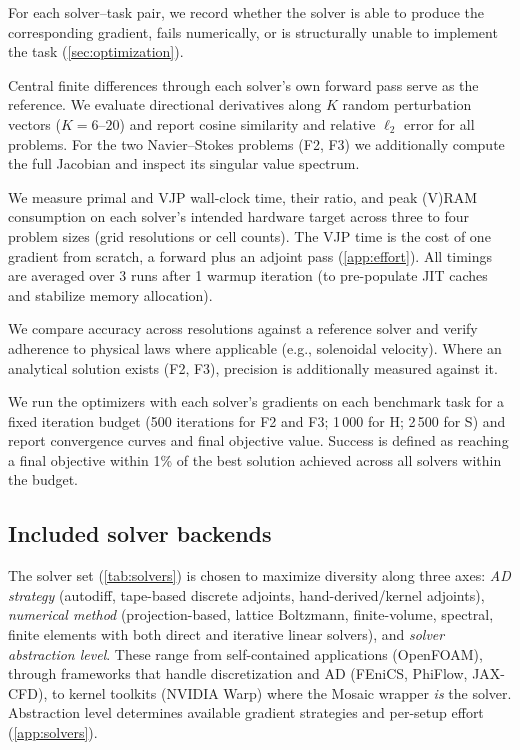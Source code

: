 \documentclass{article}
\begin{document}
\begin{description}\itemsep2pt
  \item[Setup compatibility.] For each solver--task pair, we record
    whether the solver is able to produce the corresponding gradient, fails numerically, or is
    structurally unable to implement the task (\cref{sec:optimization}).
  \item[Gradient accuracy.] Central finite differences through each
    solver's own forward pass serve as the reference. We
    evaluate directional derivatives along $K$ random perturbation
    vectors ($K{=}6$--$20$) and report cosine similarity and relative
    $\ell_2$ error for all problems. For the two Navier--Stokes
    problems (F2, F3) we additionally compute the full Jacobian and
    inspect its singular value spectrum.
  \item[Performance.] We measure primal and VJP wall-clock time, their
    ratio, and peak (V)RAM consumption on each solver's intended hardware
    target across three to four problem sizes (grid resolutions or cell counts).
    The VJP time is the cost of one gradient from scratch, a forward plus an
    adjoint pass (\cref{app:effort}).
    All timings are averaged over 3 runs after 1 warmup iteration
    (to pre-populate JIT caches and stabilize memory allocation).
  \item[Forward accuracy.] We compare accuracy across resolutions against a reference solver and verify adherence to physical laws where applicable (e.g., solenoidal
    velocity). Where an analytical solution exists (F2, F3),
    precision is additionally measured against it.
  \item[Optimization convergence.] We run the optimizers with each solver's
    gradients on each benchmark task for a fixed iteration budget
    (500 iterations for F2 and F3; 1\,000 for H; 2\,500 for S) and report convergence
    curves and final objective value. Success is defined as reaching a
    final objective within 1\% of the best solution achieved across all
    solvers within the budget.
\end{description}

\subsection{Included solver backends}
\label{sec:solvers}

The solver set (\cref{tab:solvers}) is chosen to maximize diversity
along three axes: \emph{AD strategy} (autodiff, tape-based discrete
adjoints, hand-derived/kernel adjoints), \emph{numerical method} (projection-based, lattice Boltzmann,
finite-volume, spectral, finite elements with both direct and iterative
linear solvers), and \emph{solver abstraction level}.
These range from self-contained applications (OpenFOAM),
through frameworks that handle discretization and AD (FEniCS,
PhiFlow, JAX-CFD), to kernel toolkits (NVIDIA Warp) where the
Mosaic wrapper \emph{is} the solver. Abstraction level determines
available gradient strategies and per-setup effort
(\cref{app:solvers}).
\end{document}

